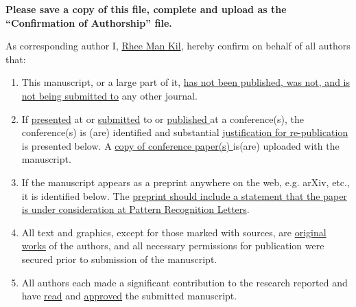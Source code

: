 \documentclass[times,twocolumn,final,authoryear]{elsarticle}
\begin{document}
\thispagestyle{empty}
                                                             
\begin{table}[!th]

\begin{minipage}{.9\textwidth}
\baselineskip12pt
\ifpreprint
  \vspace*{1pc}
\else
  \vspace*{-6pc}
\fi

\vskip6pt


\vskip1pc


{\bf Please save a copy of this file, complete and upload as the 
``Confirmation of Authorship'' file.}

\vskip1pc

As corresponding author 
I, \underline{ Rhee Man Kil\hphantom{\hspace*{5cm}}},
hereby confirm on behalf of all authors that:

\vskip1pc

\begin{enumerate}
\itemsep=3pt
\item This manuscript, or a large part of it, \underline {has not been
published,  was not, and is not being submitted to} any other journal. 

\item If \underline {presented} at or \underline {submitted} to or
\underline  {published }at a conference(s), the conference(s) is (are)
identified and  substantial \underline {justification for
re-publication} is presented  below. A \underline {copy of
conference paper(s) }is(are) uploaded with the  manuscript.

\item If the manuscript appears as a preprint anywhere on the web, e.g.
arXiv,  etc., it is identified below. The \underline {preprint should
include a  statement that the paper is under consideration at Pattern
Recognition  Letters}.

\item All text and graphics, except for those marked with sources, are
\underline  {original works} of the authors, and all necessary
permissions for  publication were secured prior to submission of the
manuscript.

\item All authors each made a significant contribution to the research
reported  and have \underline {read} and \underline {approved} the
submitted  manuscript. 
\end{enumerate}


\end{minipage}
\end{table}
\end{document}
